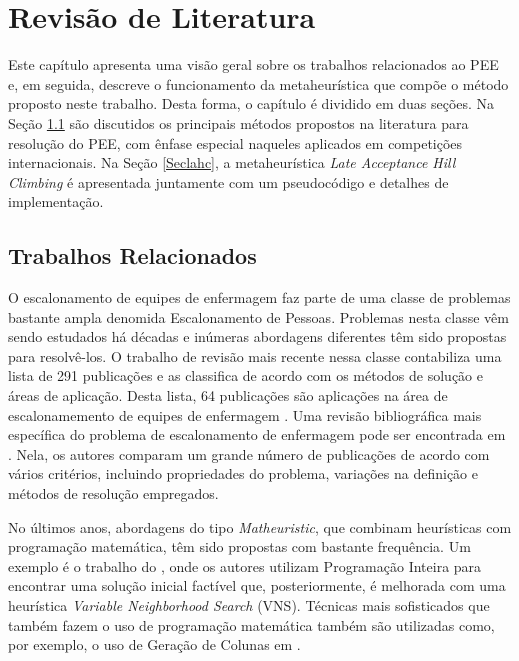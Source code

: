 \documentclass[cic,tc, twoside]{iiufrgs}
\begin{document}
\chapter{Revisão de Literatura} \label{ChapReview}

Este capítulo apresenta uma visão geral sobre os trabalhos relacionados ao PEE e, em seguida, descreve o funcionamento da metaheurística que compõe o método proposto neste trabalho. Desta forma, o capítulo é dividido em duas seções. 
Na Seção \ref{SecMetodos} são discutidos os principais métodos propostos na literatura para resolução do PEE, com ênfase especial naqueles aplicados em competições internacionais. Na Seção \ref{Seclahc}, a metaheurística \emph{Late Acceptance Hill Climbing} é apresentada juntamente com um pseudocódigo e detalhes de implementação. 

\section{Trabalhos Relacionados} \label{SecMetodos}

O escalonamento de equipes de enfermagem faz parte de uma classe de problemas bastante ampla denomida Escalonamento de Pessoas. Problemas nesta classe vêm sendo estudados há décadas e inúmeras abordagens diferentes têm sido propostas para resolvê-los.
O trabalho de revisão mais recente nessa classe contabiliza uma lista de 291 publicações e as classifica de acordo com os métodos de solução e áreas de aplicação. Desta lista, 64 publicações são aplicações na área de escalonamemento de equipes de enfermagem \cite{van2013personnel}. 
Uma revisão bibliográfica mais específica do problema de escalonamento de enfermagem pode ser encontrada em \citet{burke2004state}. 
Nela, os autores comparam um grande número de publicações de acordo com vários critérios, incluindo propriedades do problema, variações na definição e métodos de resolução empregados.

No últimos anos, abordagens do tipo \emph{Matheuristic}, que combinam heurísticas com programação matemática, têm sido propostas com bastante frequência. Um exemplo é o trabalho do \citet{burke2010hybrid}, onde os autores utilizam Programação Inteira para encontrar uma solução inicial factível que, posteriormente, é melhorada com uma heurística \textit{Variable Neighborhood Search} (VNS). 
Técnicas mais sofisticados que também fazem o uso de programação matemática também são utilizadas como, por exemplo, o uso de Geração de
Colunas em \citet{mason1998nested}.
\end{document}
